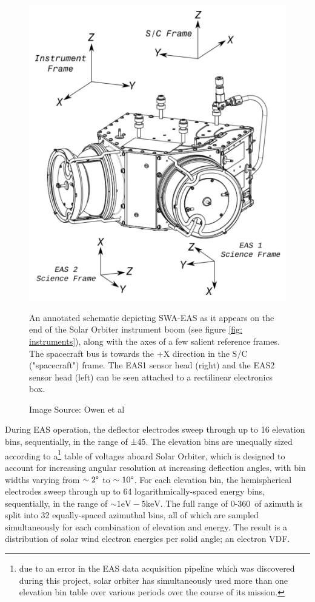 \newpage
\begin{figure}[h!]
    \centering
    \includegraphics[width=0.75\linewidth]{figures/SWA-EA Sensor Heads.png}
    \caption{An annotated schematic depicting SWA-EAS as it appears on the end of the Solar Orbiter instrument boom (see figure \ref{fig: instruments}), along with the axes of a few salient reference frames\cite{owen2021}. The spacecraft bus is towards the +X direction in the S/C ("spacecraft") frame. The EAS1 sensor head (right) and the EAS2 sensor head (left) can be seen attached to a rectilinear electronics box.}
    \caption*{Image Source: Owen et al\cite{owen2021}}
    \label{fig: EAS schematic}
\end{figure}

During EAS operation, the deflector electrodes sweep through up to 16 elevation bins, sequentially, in the range of ±45\degree. The elevation bins are unequally sized according to a\footnote{due to an error in the EAS data acquisition pipeline which was discovered during this project, solar orbiter has simultaneously used more than one elevation bin table over various periods over the course of its mission.} table of voltages aboard Solar Orbiter, which is designed to account for increasing angular resolution at increasing deflection angles, with bin  widths varying from \(\sim2\degree\) to \(\sim10\degree\). For each elevation bin, the hemispherical electrodes sweep through up to 64 logarithmically-spaced energy bins, sequentially, in the range of \(\sim1\textrm{eV}-5\textrm{keV}\). The full range of 0-360\degree\ of azimuth is split into 32 equally-spaced azimuthal bins, all of which are sampled simultaneously for each combination of elevation and energy. The result is a distribution of solar wind electron energies per solid angle; an electron VDF.
\\

